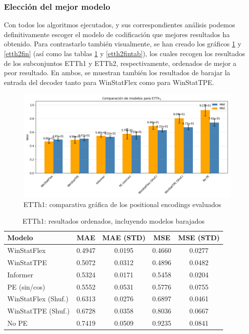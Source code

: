 \subsubsection{Elección del mejor modelo}

Con todos los algoritmos ejecutados, y sus correspondientes análisis podemos definitivamente escoger el modelo de codificación que mejores resultados ha obtenido. Para contrastarlo también visualmente, se han creado los gráficos \ref{etth1fin} y \ref{etth2fin} (así como las tablas \ref{etth1fintab} y \ref{etth2fintab}), los cuales recogen los resultados de los subconjuntos ETTh1 y ETTh2, respectivamente, ordenados de mejor a peor resultado. En ambos, se muestran también los resultados de barajar la entrada del decoder tanto para WinStatFlex como para WinStatTPE.\\


\begin{figure}[!ht]
	\centering
	\includegraphics[scale=0.475]{img/etth1fin}
	\caption{ETTh1: comparativa gráfica de los positional encodings evaluados}
	\label{etth1fin}
\end{figure}

\begin{table}[ht]
	\centering
	\begin{tabular}{l|c|c|c|c}
		\toprule
		Modelo & {MAE} & {MAE (STD)} & {MSE} & {MSE (STD)}  \\
		\midrule
		WinStatFlex            & 0.4947 & 0.0195 & 0.4660 & 0.0277 \\
		WinStatTPE             & 0.5072 & 0.0312 & 0.4896 & 0.0482 \\
		Informer               & 0.5324 & 0.0171 & 0.5458 & 0.0204 \\
		PE (sin/cos)           & 0.5552 & 0.0531 & 0.5776 & 0.0755 \\
		WinStatFlex (Shuf.)    & 0.6313 & 0.0276 & 0.6897 & 0.0461 \\
		WinStatTPE (Shuf.)     & 0.6728 & 0.0358 & 0.8036 & 0.0667 \\
		No PE                  & 0.7419 & 0.0509 & 0.9235 & 0.0841 \\
		\bottomrule
	\end{tabular}
	\caption{ETTh1: resultados ordenados, incluyendo modelos barajados}
	\label{etth1fintab}
\end{table}

